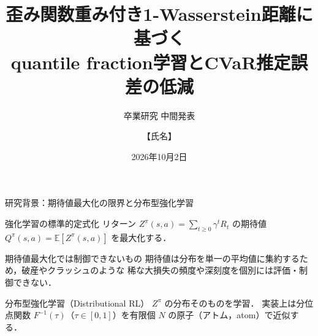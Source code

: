 \documentclass[aspectratio=169, 10pt]{beamer}
\title[歪み重み付き$W_1$によるquantile fraction学習]{歪み関数重み付き1-Wasserstein距離に基づく\texorpdfstring{\\}{ }quantile fraction学習とCVaR推定誤差の低減}
\subtitle{卒業研究 中間発表}
\author[【氏名】]{【氏名】}
\institute[【研究室名】]{【研究室名】\\ 指導教員：【指導教員名】}
\date{2026年10月2日}
\newcommand{\blue}[1]{\textcolor{blue!80!black}{#1}}
\providecommand{\Finv}{}\renewcommand{\Finv}{F^{-1}}
\newcommand{\E}{\mathbb{E}}
\begin{document}
\begin{frame}[plain]
  \titlepage
\end{frame}

\begin{frame}{研究背景：期待値最大化の限界と分布型強化学習}
  \begin{block}{強化学習の標準的定式化}
    リターン $Z^\pi(s,a)=\sum_{t\ge 0}\gamma^t R_t$ の期待値 $Q^\pi(s,a)=\E[Z^\pi(s,a)]$ を最大化する．
  \end{block}
  \begin{alertblock}{期待値最大化では制御できないもの}
    期待値は分布を単一の平均値に集約するため，破産やクラッシュのような
    \alert{稀な大損失の頻度や深刻度}を個別には評価・制御できない．
  \end{alertblock}
  \begin{block}{分布型強化学習（Distributional RL）}
    $Z^\pi$ の\alert{分布そのもの}を学習．
    実装上は分位点関数 $\Finv(\tau)$（$\tau\in[0,1]$）を\blue{有限個 $N$ の原子}（アトム，atom）で近似する．
  \end{block}
\end{frame}
\end{document}

